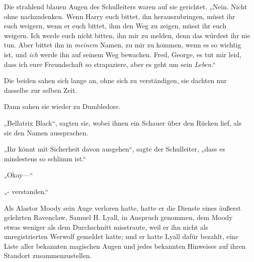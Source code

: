 Die strahlend blauen Augen des Schulleiters waren auf sie gerichtet. „Nein. Nicht ohne nachzudenken. Wenn Harry euch bittet, ihn herauszubringen, müsst ihr euch weigern, wenn er euch bittet, ihm den Weg zu zeigen, müsst ihr euch weigern. Ich werde euch nicht bitten, ihn mir zu melden, denn das würdest ihr nie tun. Aber bittet ihn in \emph{meinem} Namen, zu mir zu kommen, wenn es so wichtig ist, und \emph{ich} werde ihn auf seinem Weg bewachen. Fred, George, es tut mir leid, dass ich eure Freundschaft so strapaziere, aber es geht um sein \emph{Leben}.“

Die beiden sahen sich lange an, ohne sich zu verständigen, sie dachten nur dasselbe zur selben Zeit.

Dann sahen sie wieder zu Dumbledore.

„Bellatrix Black“, sagten sie, wobei ihnen ein Schauer über den Rücken lief, als sie den Namen aussprachen.

„Ihr könnt mit Sicherheit davon ausgehen“, sagte der Schulleiter, „dass es mindestens so schlimm ist.“

„Okay—“

„- verstanden.“


Als Alastor Moody sein Auge verloren hatte, hatte er die Dienste eines äußerst gelehrten Ravenclaw, Samuel H. Lyall, in Anspruch genommen, dem Moody etwas weniger als dem Durchschnitt misstraute, weil er ihn nicht als unregistrierten Werwolf gemeldet hatte; und er hatte Lyall dafür bezahlt, eine Liste aller bekannten magischen Augen und jedes bekannten Hinweises auf ihren Standort zusammenzustellen.


